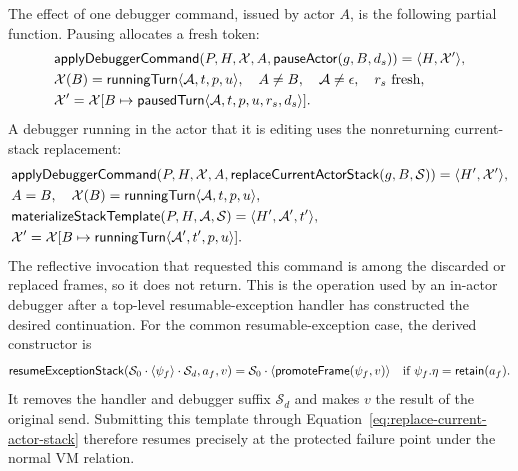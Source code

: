 The effect of one debugger command, issued by actor $A$, is the following
partial function.  Pausing allocates a fresh token:
\begin{equation}\label{eq:pause-actor-effect}
\begin{aligned}
 &\mathsf{applyDebuggerCommand}
   (P,H,\mathcal X,A,\mathsf{pauseActor}(g,B,d_s))
       =\langle H,\mathcal X'\rangle,\\
 &\mathcal X(B)=\mathsf{runningTurn}\langle\mathcal A,t,p,u\rangle,
 \quad A\ne B,\quad\mathcal A\ne\epsilon,\quad r_s\text{ fresh},\\
 &\mathcal X'=\mathcal X[B\mapsto
   \mathsf{pausedTurn}\langle\mathcal A,t,p,u,r_s,d_s\rangle].
\end{aligned}
\end{equation}
A debugger running in the actor that it is editing uses the nonreturning
current-stack replacement:
\begin{equation}\label{eq:replace-current-actor-stack}
\begin{aligned}
 &\mathsf{applyDebuggerCommand}
   (P,H,\mathcal X,A,\mathsf{replaceCurrentActorStack}(g,B,\mathcal S))
       =\langle H',\mathcal X'\rangle,\\
 &A=B,\quad
 \mathcal X(B)=\mathsf{runningTurn}\langle\mathcal A,t,p,u\rangle,\\
 &\mathsf{materializeStackTemplate}(P,H,\mathcal A,\mathcal S)
       =\langle H',\mathcal A',t'\rangle,\\
 &\mathcal X'=\mathcal X[B\mapsto
       \mathsf{runningTurn}\langle\mathcal A',t',p,u\rangle].
\end{aligned}
\end{equation}
The reflective invocation that requested this command is among the discarded
or replaced frames, so it does not return.  This is the operation used by an
in-actor debugger after a top-level resumable-exception handler has constructed
the desired continuation.
For the common resumable-exception case, the derived constructor is
\begin{equation}\label{eq:resume-exception-stack-template}
 \mathsf{resumeExceptionStack}
  (\mathcal S_0\cdot\langle\psi_f\rangle\cdot\mathcal S_d,a_f,v)
 =\mathcal S_0\cdot
   \langle\mathsf{promoteFrame}(\psi_f,v)\rangle
 \quad\text{if }\psi_f.\eta=\mathsf{retain}(a_f).
\end{equation}
It removes the handler and debugger suffix $\mathcal S_d$ and makes $v$ the
result of the original  send.  Submitting this template through
Equation~\eqref{eq:replace-current-actor-stack} therefore resumes precisely at
the protected failure point under the normal VM relation.

